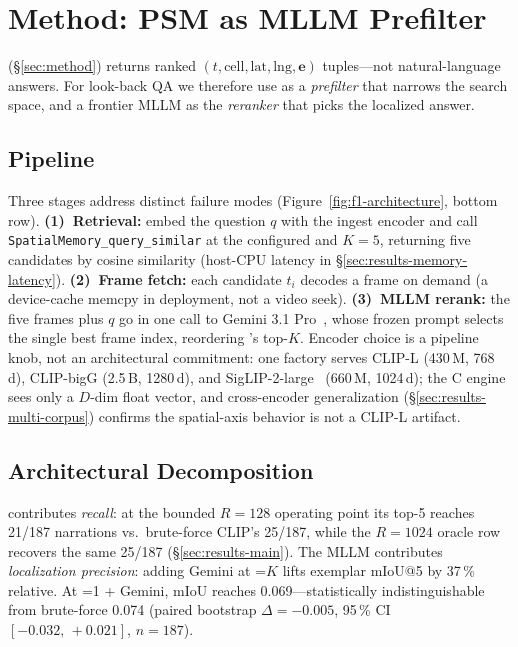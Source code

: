 
\section{Method: PSM as MLLM Prefilter}
\label{sec:pipeline}

\psm{} (\S\ref{sec:method}) returns ranked
$(t, \mathrm{cell}, \mathrm{lat}, \mathrm{lng}, \mathbf{e})$
tuples---not natural-language answers.
For look-back QA we therefore use \psm{} as a \emph{prefilter}
that narrows the search space, and a frontier MLLM as the
\emph{reranker} that picks the localized answer.

\subsection{Pipeline}
\label{sec:pipeline-stages}

Three stages address distinct failure modes
(Figure~\ref{fig:f1-architecture}, bottom row).
\textbf{(1)~Retrieval:} embed the question $q$ with the ingest encoder and call
\texttt{SpatialMemory\_query\_similar} at the configured \caponek{} and $K{=}5$,
returning five candidates by cosine similarity (host-CPU latency in
\S\ref{sec:results-memory-latency}).
\textbf{(2)~Frame fetch:} each candidate $t_i$ decodes a frame on demand (a
device-cache memcpy in deployment, not a video seek).
\textbf{(3)~MLLM rerank:} the five frames plus $q$ go in one call to Gemini 3.1
Pro~\cite{google2026gemini}, whose frozen prompt selects the single best frame
index, reordering \psm{}'s top-$K$.
Encoder choice is a pipeline knob, not an architectural commitment: one factory
serves CLIP-L (430\,M, 768\,d), CLIP-bigG (2.5\,B, 1280\,d), and
SigLIP-2-large~\cite{tschannen2025siglip2} (660\,M, 1024\,d); the C engine sees
only a $D$-dim float vector, and cross-encoder generalization
(\S\ref{sec:results-multi-corpus}) confirms the spatial-axis behavior is not a
CLIP-L artifact.

\subsection{Architectural Decomposition}
\label{sec:pipeline-rationale}

\psm{} contributes \emph{recall}: at the bounded $R{=}128$ operating
point its top-5 reaches 21/187 narrations vs.\ brute-force CLIP's 25/187,
while the $R{=}1024$ oracle row recovers the same 25/187
(\S\ref{sec:results-main}).
The MLLM contributes \emph{localization precision}: adding Gemini
at \caponek{}=$K$ lifts exemplar mIoU@5 by 37\,\% relative.
At \caponek{}=1 + Gemini, mIoU reaches 0.069---statistically
indistinguishable from brute-force 0.074
(paired bootstrap $\Delta{=}{-0.005}$, 95\,\% CI
$[-0.032,\,+0.021]$, $n{=}187$).
